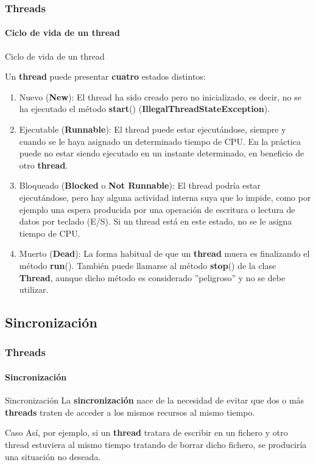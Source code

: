 \documentclass{beamer}
\begin{document}
	\begin{frame}
		\frametitle{Threads}
		\framesubtitle{Ciclo de vida de un thread}

        \begin{block}{Ciclo de vida de un thread}
            {\scriptsize
            Un \textbf{thread} puede presentar \textbf{cuatro} estados distintos:
            \begin{enumerate}
                \item Nuevo (\textbf{New}): El thread ha sido creado pero no inicializado, es decir, no se ha ejecutado el m\'etodo \textbf{start}() (\textbf{IllegalThreadStateException}). 
                \item Ejecutable (\textbf{Runnable}): El thread puede estar ejecut\'andose, siempre y cuando se le haya asignado un determinado tiempo de CPU. En la pr\'actica puede no estar siendo ejecutado en un instante determinado, en beneficio de otro \textbf{thread}.
                \item Bloqueado (\textbf{Blocked} o \textbf{Not Runnable}): El thread podr\'ia estar ejecut\'andose, pero hay alguna actividad interna suya que lo impide, como por ejemplo una espera producida por una operaci\'on de escritura o lectura de datos por teclado (E/S). Si un thread est\'a en este estado, no se le asigna tiempo de CPU.
                \item Muerto (\textbf{Dead}): La forma habitual de que un \textbf{thread} muera es finalizando el m\'etodo \textbf{run}(). Tambi\'en puede llamarse al m\'etodo \textbf{stop}() de la clase \textbf{Thread}, aunque dicho m\'etodo es considerado ''peligroso'' y no se debe utilizar.
            \end{enumerate}
            }
        \end{block}
	\end{frame}	

    \subsection{Sincronizaci\'on}

	\begin{frame}
		\frametitle{Threads}
		\framesubtitle{Sincronizaci\'on}

        \begin{block}{Sincronizaci\'on}
            La \textbf{sincronizaci\'on} nace de la necesidad de evitar que dos o m\'as \textbf{threads} traten de acceder a los mismos recursos al mismo tiempo.
        \end{block}
        \begin{exampleblock}{Caso}
            As\'i, por ejemplo, si un \textbf{thread} tratara de escribir en un fichero y otro thread estuviera al mismo tiempo tratando de borrar dicho fichero, se producir\'ia una situaci\'on
no deseada.
        \end{exampleblock}
	\end{frame}
\end{document}
